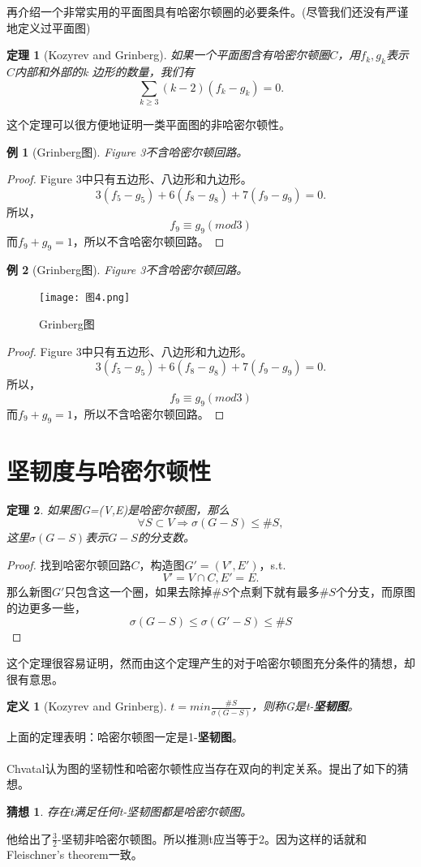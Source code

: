 \documentclass[a4paper,11pt]{book}
\newtheorem{theorem}{\textbf{定理}}[section]
\newtheorem{defination}{\textbf{定义}}[section]
\newtheorem{sample}{\textbf{例}}[section]
\newtheorem{guess}{\textbf{猜想}}[section]
\begin{document}
再介绍一个非常实用的平面图具有哈密尔顿圈的必要条件。(尽管我们还没有严谨地定义过平面图)
\begin{theorem}[Kozyrev and Grinberg] \K 如果一个平面图含有哈密尔顿圈$C$，用$f_k,g_k$表示$C$内部和外部的k 边形的数量，我们有$$\sum_{k\geq3}(k-2)(f_k-g_k)=0.$$\end{theorem}
这个定理可以很方便地证明一类平面图的非哈密尔顿性。

\begin{sample}[Grinberg图] Figure 3不含哈密尔顿回路。\end{sample}
\begin{proof} Figure 3中只有五边形、八边形和九边形。$$3(f_5-g_5)+6(f_8-g_8)+7(f_9-g_9)=0.$$所以，$$f_9\equiv g_9(mod 3)$$ 而$f_9+g_9=1$，所以不含哈密尔顿回路。\end{proof}
\begin{sample}[Grinberg图] Figure 3不含哈密尔顿回路。\end{sample}
\begin{figure}
  \centering
  \texttt{[image: 图4.png]}
  \caption{Grinberg图}
\end{figure}
\begin{proof} Figure 3中只有五边形、八边形和九边形。$$3(f_5-g_5)+6(f_8-g_8)+7(f_9-g_9)=0.$$所以，$$f_9\equiv g_9(mod 3)$$ 而$f_9+g_9=1$，所以不含哈密尔顿回路。\end{proof}

\section{坚韧度与哈密尔顿性}
\begin{theorem} \K 如果图G=(V,E)是哈密尔顿图，那么$$\forall S \subset V \Rightarrow \sigma(G-S)\leq \#S,$$这里$\sigma(G-S)$表示$G-S$的分支数。\end{theorem}
\begin{proof} 找到哈密尔顿回路$C$，构造图$G'=(V',E')$，s.t.$$V'=V\cap C, E'= E.$$ 那么新图$G'$只包含这一个圈，如果去除掉$\#S$个点剩下就有最多$\#S$个分支，而原图的边更多一些，$$\sigma(G-S)\leq\sigma(G'-S)\leq\#S$$\end{proof}
这个定理很容易证明，然而由这个定理产生的对于哈密尔顿图充分条件的猜想，却很有意思。

\begin{defination}[Kozyrev and Grinberg] \K $t=min\frac{\#S}{\sigma(G-S)}$，则称G是t-\textbf{坚韧图}。\end{defination}

上面的定理表明：哈密尔顿图一定是1-\textbf{坚韧图}。
\\
\\
Chvatal认为图的坚韧性和哈密尔顿性应当存在双向的判定关系。提出了如下的猜想。
\begin{guess} \K 存在t满足任何t-坚韧图都是哈密尔顿图。\end{guess}
他给出了$\frac{3}{2}$-坚韧非哈密尔顿图。所以推测t应当等于2。因为这样的话就和Fleischner's theorem一致。
\end{document}
